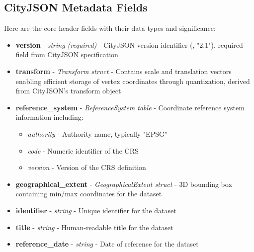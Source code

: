 \subsection{CityJSON Metadata Fields}
\label{methodology:header:cityjson_fields}

Here are the core header fields with their data types and significance:

\begin{itemize}
  \item \textbf{version} - \textit{string (required)} - CityJSON version identifier (\eg, "2.1"), required field from CityJSON specification \citep{cityjson_spec}

  \item \textbf{transform} - \textit{Transform struct} - Contains scale and translation vectors enabling efficient storage of vertex coordinates through quantization, derived from CityJSON's transform object \citep{cityjson_spec}

  \item \textbf{reference\_system} - \textit{ReferenceSystem table} - Coordinate reference system information including:
    \begin{itemize}
      \item \textit{authority} - Authority name, typically "EPSG"
      \item \textit{code} - Numeric identifier of the CRS
      \item \textit{version} - Version of the CRS definition
    \end{itemize}

  \item \textbf{geographical\_extent} - \textit{GeographicalExtent struct} - 3D bounding box containing min/max coordinates for the dataset \citep{cityjson_spec}

  \item \textbf{identifier} - \textit{string} - Unique identifier for the dataset

  \item \textbf{title} - \textit{string} - Human-readable title for the dataset

  \item \textbf{reference\_date} - \textit{string} - Date of reference for the dataset


\end{itemize}
